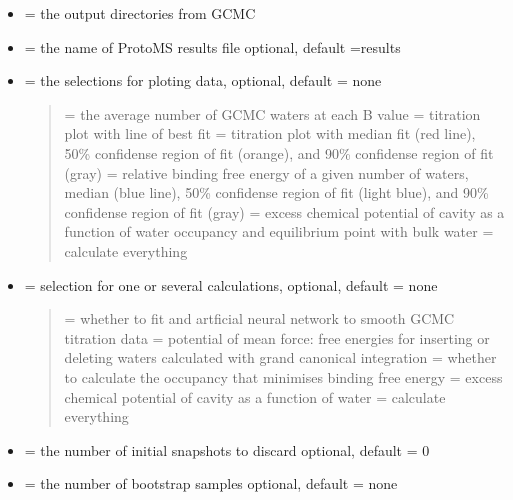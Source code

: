 \documentclass[letterpaper,10pt,english]{manual}
\begin{document}
\begin{itemize}
\item {} 
 = the output directories from GCMC

\item {} 
 = the name of ProtoMS results file
optional, default =results

\item {} 
 = the selections for ploting data,
optional, default = none
\begin{quote}

 = the average number of GCMC waters at each B value
 = titration plot with line of best fit
 = titration plot with median fit (red line), 50\% confidense region of fit (orange), and 90\% confidense region of fit (gray)
 = relative binding free energy of a given number of waters, median (blue line), 50\% confidense region of fit (light blue), and 90\% confidense region of fit (gray)
 = excess chemical potential of cavity as a function of water occupancy and equilibrium point with bulk water
 = calculate everything
\end{quote}

\item {} 
 = selection for one or several calculations,
optional, default = none
\begin{quote}

 = whether to fit and artficial neural network to smooth GCMC titration data
 = potential of mean force: free energies for inserting or deleting waters calculated with grand canonical integration
 = whether to calculate the occupancy that minimises binding free energy
 = excess chemical potential of cavity as a function of water
 = calculate everything
\end{quote}

\item {} 
 = the number of initial snapshots to discard
optional, default = 0

\item {} 
 = the number of bootstrap samples
optional, default = none


\end{itemize}
\end{document}
